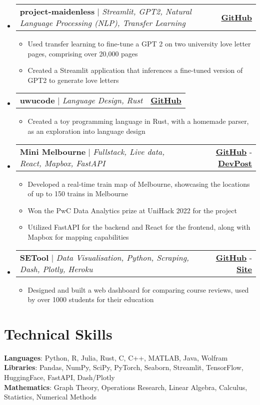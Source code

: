 \documentclass[letterpaper,11pt]{article}
\makeatletter
\newcommand{\resumeItem}[1]{
  \item\small{
    {#1 \vspace{-2pt}}
  }
}
\newcommand{\resumeProjectHeading}[2]{
    \item
    \begin{tabular*}{0.97\textwidth}{l@{\extracolsep{\fill}}r}
      \small#1 & #2 \\
    \end{tabular*}\vspace{-7pt}
}
\newcommand{\resumeSubHeadingListStart}{\begin{itemize}[leftmargin=0.15in, label={}]}
\newcommand{\resumeSubHeadingListEnd}{\end{itemize}}
\newcommand{\resumeItemListStart}{\begin{itemize}}
\newcommand{\resumeItemListEnd}{\end{itemize}\vspace{-5pt}}
\makeatother
\begin{document}
    \resumeSubHeadingListStart

    \resumeProjectHeading
    {\textbf{project-maidenless} $|$ \emph{Streamlit, GPT2, Natural Language Processing (NLP), Transfer Learning}}{\textbf{\href{https://github.com/saikumarmk/project-maidenless}{GitHub}}}
    \resumeItemListStart
    \resumeItem{Used transfer learning to fine-tune a GPT 2 on two university love letter pages, comprising over 20,000 pages}
    \resumeItem{Created a Streamlit application that inferences a fine-tuned version of GPT2 to generate love letters }
    \resumeItemListEnd
    
    \resumeProjectHeading
    {\textbf{uwucode} $|$ \emph{Language Design, Rust}}{\textbf{\href{https://github.com/saikumarmk/uwucode}{GitHub}}}
    \resumeItemListStart
      \resumeItem{Created a toy programming language in Rust, with a homemade parser, as an exploration into language design}
    \resumeItemListEnd

      \resumeProjectHeading
          {\textbf{Mini Melbourne} $|$ \emph{Fullstack, Live data, React, Mapbox, FastAPI}}{\textbf{\href{https://github.com/weLoveTrainz/MiniMelbourne}{GitHub}} - \textbf{\href{https://devpost.com/software/minimebourne}{DevPost}}}
          \resumeItemListStart
            \resumeItem{Developed a real-time train map of Melbourne, showcasing the locations of up to 150 trains in Melbourne}
            \resumeItem{Won the PwC Data Analytics prize at UniHack 2022 for the project}
            \resumeItem{Utilized FastAPI for the backend and React for the frontend, along with Mapbox for mapping capabilities}
          \resumeItemListEnd

      \resumeProjectHeading
          {\textbf{SETool} $|$ \emph{Data Visualisation, Python, Scraping, Dash, Plotly, Heroku}}{\textbf{\href{https://github.com/saikumarmk/SETool}{GitHub}} - \textbf{\href{http://http://setool.herokuapp.com/}{Site}} }
          \resumeItemListStart
            \resumeItem{Designed and built a web dashboard for comparing course reviews, used by over 1000 students for their education}
          \resumeItemListEnd



    \resumeSubHeadingListEnd


%
\section{Technical Skills}
 \begin{itemize}[leftmargin=0.15in, label={}]
    \small{\item{
     \textbf{Languages}{: Python, R, Julia, Rust, C, C++, MATLAB, Java, Wolfram} \\
     \textbf{Libraries}{: Pandas, NumPy, SciPy, PyTorch, Seaborn, Streamlit, TensorFlow, HuggingFace, FastAPI, Dash/Plotly} \\
     \textbf{Mathematics}{: Graph Theory, Operations Research, Linear Algebra, Calculus, Statistics, Numerical Methods }
    }}
 \end{itemize}


\end{document}
